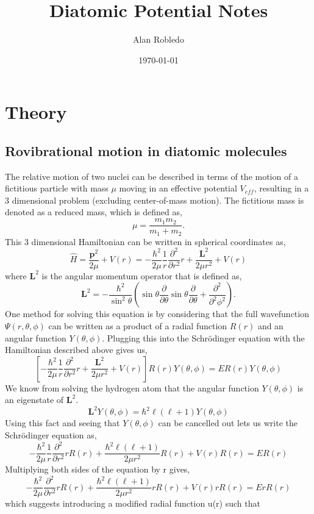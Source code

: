 \documentclass[12pt]{article}
\title{Diatomic Potential Notes}
\date{\today}
\author{Alan Robledo}
\newcommand{\be}{\begin{equation}}
\newcommand{\ee}{\end{equation}}
\begin{document}
\maketitle
\section{Theory}
\subsection{Rovibrational motion in diatomic molecules}
The relative motion of two nuclei can be described in terms of the motion of a fictitious particle with mass $\mu$ moving in an effective potential $V_{eff}$, resulting in a 3 dimensional problem (excluding center-of-mass motion).\cite{mitnotes}\cite{zhang} The fictitious mass is denoted as a reduced mass, which is defined as,
\be
  \mu = \frac{m_1m_2}{m_1+m_2} .
\ee
This 3 dimensional Hamiltonian can be written in spherical coordinates as,
\be
    \hat{H} = \frac{\textbf{p}^2}{2\mu} + V(r) = -\frac{\hbar^2}{2\mu} \frac{1}{r} \frac{\partial^2}{\partial r^2} r + \frac{\textbf{L}^2}{2\mu r^2} + V(r)
\ee
where $\textbf{L}^2$ is the angular momentum operator that is defined as,
\be
    \textbf{L}^2 = -\frac{\hbar^2}{\sin^2\theta} \left(\sin\theta \frac{\partial}{\partial \theta} \sin\theta \frac{\partial}{\partial \theta} + \frac{\partial^2}{\partial^2 \phi^2} \right) .
\ee
One method for solving this equation is by considering that the full wavefunction $\Psi(r,\theta,\phi)$ can be written as a product of a radial function $R(r)$ and an angular function $Y(\theta,\phi)$.\cite{mitnotes} Plugging this into the Schr\"odinger equation with the Hamiltonian described above gives us,
\be
    \left[ -\frac{\hbar^2}{2\mu} \frac{1}{r} \frac{\partial^2}{\partial r^2} r + \frac{\textbf{L}^2}{2\mu r^2} + V(r) \right] R(r) Y(\theta,\phi) = ER(r)Y(\theta,\phi)
\ee
We know from solving the hydrogen atom that the angular function $Y(\theta,\phi)$ is an eigenstate of $\textbf{L}^2$.
\be
    \textbf{L}^2 Y(\theta,\phi) = \hbar^2 \ell(\ell+1)Y(\theta,\phi)
\ee
Using this fact and seeing that $Y(\theta,\phi)$ can be cancelled out lets us write the Schr\"odinger equation as,
\be
    -\frac{\hbar^2}{2\mu} \frac{1}{r} \frac{\partial^2}{\partial r^2} rR(r) + \frac{\hbar^2 \ell(\ell+1)}{2\mu r^2}R(r) + V(r) R(r) = ER(r)
\ee
Multiplying both sides of the equation by r gives,
\be
    -\frac{\hbar^2}{2\mu} \frac{\partial^2}{\partial r^2} rR(r) + \frac{\hbar^2 \ell(\ell+1)}{2\mu r^2}r R(r) + V(r) r R(r) = E r R(r)
\ee
which suggests introducing a modified radial function u(r) such that
\end{document}
